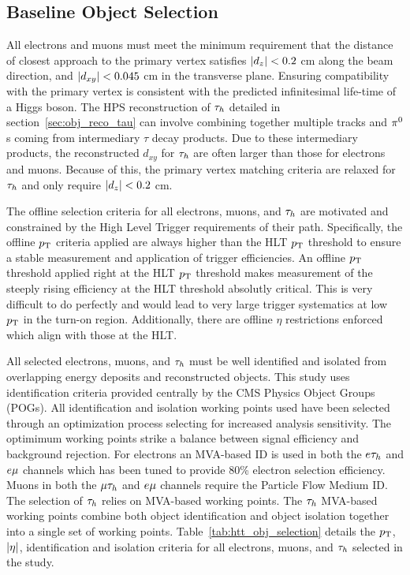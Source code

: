 \subsection{Baseline Object Selection}
\label{sec:htt_obj_sel}
All electrons and muons must meet the minimum requirement
that the distance of closest approach to the primary vertex satisfies $\lvert d_z\rvert<0.2$ cm
along the beam direction, and $\lvert d_{xy}\rvert<0.045$ cm in the transverse plane. Ensuring
compatibility with the primary vertex is consistent with the predicted infinitesimal life-time of
a Higgs boson. The HPS reconstruction of $\tau_{h}$ detailed in section~\ref{sec:obj_reco_tau} can involve
combining together multiple tracks and $\pi^{0}$s coming from intermediary $\tau$ decay products.
Due to these intermediary products, the reconstructed $d_{xy}$ for $\tau_{h}$ are often
larger than those for electrons and muons. Because of this, the primary vertex matching
criteria are relaxed for $\tau_{h}$ and only require $\lvert d_z\rvert<0.2$ cm.

The offline selection criteria for all electrons, muons, and $\tau_{h}$ are motivated and constrained
by the High Level Trigger requirements of their path. Specifically, the offline $p_\mathrm{T}$ criteria
applied are always higher than the HLT $p_\mathrm{T}$ threshold to ensure a stable measurement and application
of trigger efficiencies. An offline $p_\mathrm{T}$ threshold applied right at the HLT $p_\mathrm{T}$ threshold
makes measurement of the steeply rising efficiency at the HLT threshold absolutly critical.
This is very difficult to do perfectly and would lead to very large trigger systematics
at low $p_\mathrm{T}$ in the turn-on region. Additionally, there are offline $\eta$ restrictions
enforced which align with those at the HLT.

All selected electrons, muons, and $\tau_{h}$ must be well identified and isolated from overlapping
energy deposits and reconstructed objects. This study uses identification criteria
provided centrally by the CMS Physics Object Groups (POGs). All identification and isolation
working points used have been selected through an optimization process selecting
for increased analysis sensitivity. The optimimum working points strike a balance
between signal efficiency and background rejection. For electrons an MVA-based ID
is used in both the $e\tau_{h}$ and $e\mu$ channels which has been tuned to provide 
80\% electron selection efficiency. Muons in both the $\mu\tau_{h}$ and $e\mu$ channels
require the Particle Flow Medium ID. The selection of $\tau_{h}$ relies on MVA-based working
points. The $\tau_{h}$ MVA-based working points combine both object identification and object
isolation together into a single set of working points. Table~\ref{tab:htt_obj_selection}
details the $p_\mathrm{T}$, $\lvert\eta\rvert$, identification and isolation criteria for all electrons, muons,
and $\tau_{h}$ selected in the study.


